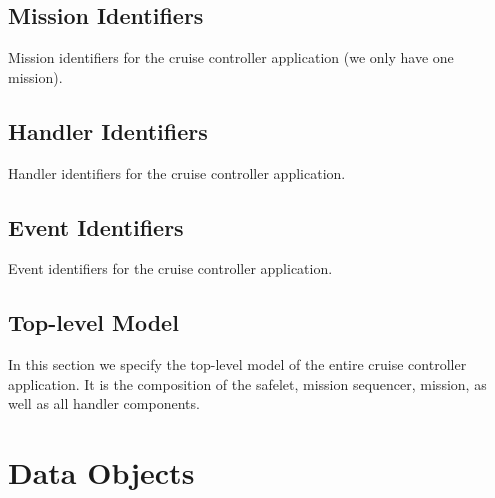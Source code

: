 \documentclass{article}
\begin{document}
\subsection{Mission Identifiers}

Mission identifiers for the cruise controller application (we only have one mission).
%
\begin{circusbox}

\end{circusbox}

\subsection{Handler Identifiers}

Handler identifiers for the cruise controller application.
%
\begin{circusbox}

\end{circusbox}

\pagebreak

\subsection{Event Identifiers}

Event identifiers for the cruise controller application.
%
\begin{circusbox}

\end{circusbox}

\newpage

\subsection{Top-level Model}

In this section we specify the top-level model of the entire cruise controller application. It is the composition of the safelet, mission sequencer, mission, as well as all handler components.
%


\newpage


\section{Data Objects}
\end{document}
